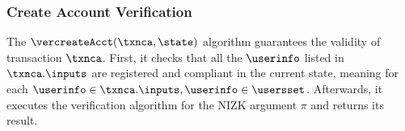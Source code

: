 \subsubsection{Create Account Verification}

The $\vercreateAcct(\txnca, \state)$ algorithm guarantees the validity of transaction $\txnca$. First, it checks that all the $\userinfo$ listed in $\txnca.\inputs$ are registered and compliant in the current state, meaning for each $\userinfo \in \txnca.\inputs, \userinfo \in \usersset$. Afterwards, it executes the verification algorithm for the NIZK argument $\pi$ and returns its result.